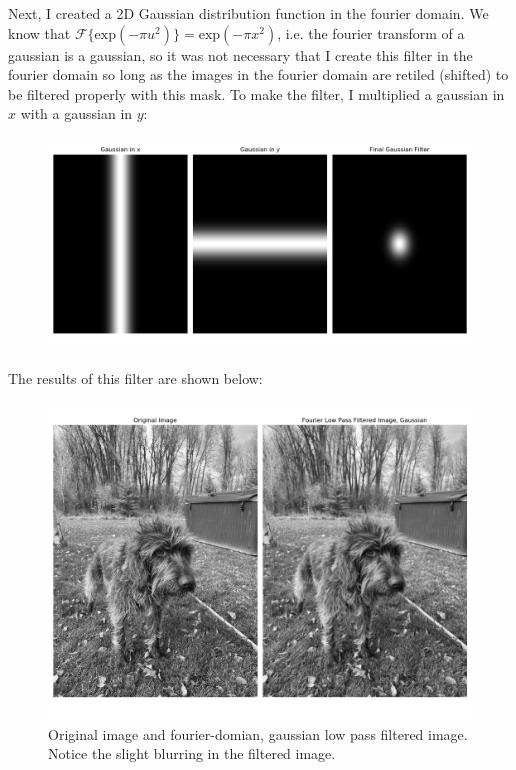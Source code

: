 \documentclass[]{article}
\begin{document}
	
	Next, I created a 2D Gaussian distribution function in the fourier domain. We know that $\mathcal{F} \{\text{exp}(-\pi u^2)\} = \text{exp}(-\pi x^2)$, i.e. the fourier transform of a gaussian is a gaussian, so it was not necessary that I create this filter in the fourier domain so long as the images in the fourier domain are retiled (shifted) to be filtered properly with this mask. To make the filter, I multiplied a gaussian in $x$ with a gaussian in $y$:
	\begin{figure}[H]
		\centering
		\includegraphics[width=5.5in]{p1_output/gaussian_filter.png}
		\label{enumeratred_mse}
	\end{figure}

The results of this filter are shown below:
	
	\begin{figure}[H]
		\centering
		\includegraphics[width=6.5in]{p1_output/img_0_f_gaussian.png}
		\caption{Original image and fourier-domian, gaussian low pass filtered image. Notice the slight blurring in the filtered image.}
	\end{figure}
\end{document}

